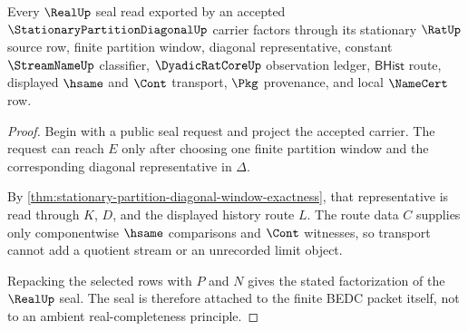 \begin{theorem}
\label{thm:stationary-partition-diagonal-seal-boundary}
Every $\RealUp$ seal read exported by an accepted $\StationaryPartitionDiagonalUp$ carrier factors through its stationary $\RatUp$ source row, finite partition window, diagonal representative, constant $\StreamNameUp$ classifier, $\DyadicRatCoreUp$ observation ledger, $\mathsf{BHist}$ route, displayed $\hsame$ and $\Cont$ transport, $\Pkg$ provenance, and local $\NameCert$ row.
\end{theorem}
\begin{proof}
Begin with a public seal request and project the accepted carrier. The request can reach $E$ only after choosing one finite partition window and the corresponding diagonal representative in $\Delta$.

By \autoref{thm:stationary-partition-diagonal-window-exactness}, that representative is read through $K$, $D$, and the displayed history route $L$. The route data $C$ supplies only componentwise $\hsame$ comparisons and $\Cont$ witnesses, so transport cannot add a quotient stream or an unrecorded limit object.

Repacking the selected rows with $P$ and $N$ gives the stated factorization of the $\RealUp$ seal. The seal is therefore attached to the finite BEDC packet itself, not to an ambient real-completeness principle.
\end{proof}

